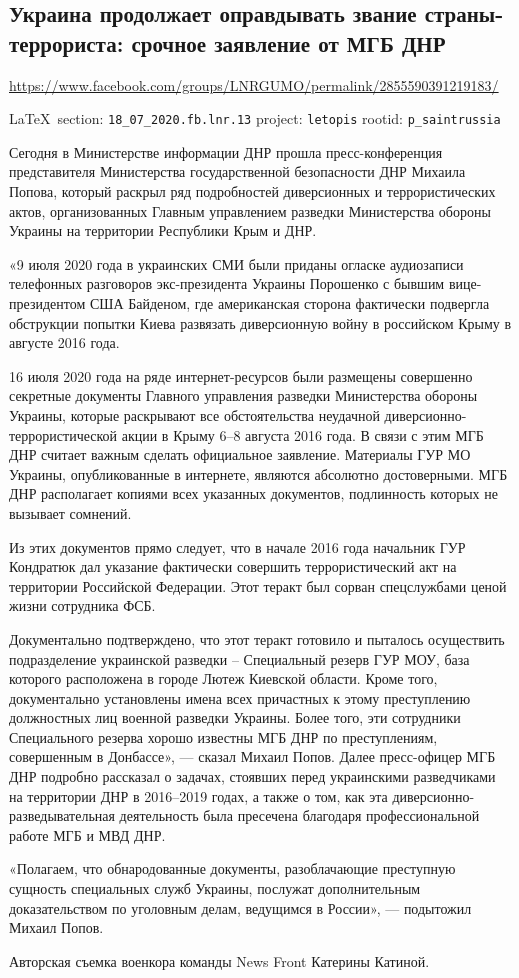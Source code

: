  
 

\subsection{Украина продолжает оправдывать звание страны-террориста: срочное заявление от МГБ ДНР}
\url{https://www.facebook.com/groups/LNRGUMO/permalink/2855590391219183/}
  
\vspace{0.5cm}
{\small\LaTeX~section: \verb|18_07_2020.fb.lnr.13| project: \verb|letopis| rootid: \verb|p_saintrussia|}
\vspace{0.5cm}

Сегодня в Министерстве информации ДНР прошла пресс-конференция представителя
Министерства государственной безопасности ДНР Михаила Попова, который раскрыл
ряд подробностей диверсионных и террористических актов, организованных Главным
управлением разведки Министерства обороны Украины на территории Республики Крым
и ДНР.

«9 июля 2020 года в украинских СМИ были приданы огласке аудиозаписи телефонных
разговоров экс-президента Украины Порошенко с бывшим вице-президентом США
Байденом, где американская сторона фактически подвергла обструкции попытки
Киева развязать диверсионную войну в российском Крыму в августе 2016 года.

16 июля 2020 года на ряде интернет-ресурсов были размещены совершенно секретные
документы Главного управления разведки Министерства обороны Украины, которые
раскрывают все обстоятельства неудачной диверсионно-террористической акции в
Крыму 6–8 августа 2016 года.  В связи с этим МГБ ДНР считает важным сделать
официальное заявление.  Материалы ГУР МО Украины, опубликованные в интернете,
являются абсолютно достоверными. МГБ ДНР располагает копиями всех указанных
документов, подлинность которых не вызывает сомнений.

Из этих документов прямо следует, что в начале 2016 года начальник ГУР
Кондратюк дал указание фактически совершить террористический акт на территории
Российской Федерации. Этот теракт был сорван спецслужбами ценой жизни
сотрудника ФСБ.

Документально подтверждено, что этот теракт готовило и пыталось осуществить
подразделение украинской разведки – Специальный резерв ГУР МОУ, база которого
расположена в городе Лютеж Киевской области.  Кроме того, документально
установлены имена всех причастных к этому преступлению должностных лиц военной
разведки Украины. Более того, эти сотрудники Специального резерва хорошо
известны МГБ ДНР по преступлениям, совершенным в Донбассе», — сказал Михаил
Попов.  Далее пресс-офицер МГБ ДНР подробно рассказал о задачах, стоявших перед
украинскими разведчиками на территории ДНР в 2016–2019 годах, а также о том,
как эта диверсионно-разведывательная деятельность была пресечена благодаря
профессиональной работе МГБ и МВД ДНР.

«Полагаем, что обнародованные документы, разоблачающие преступную сущность
специальных служб Украины, послужат дополнительным доказательством по уголовным
делам, ведущимся в России», — подытожил Михаил Попов.

Авторская съемка военкора команды News Front Катерины Катиной. 
